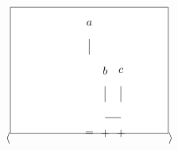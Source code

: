 \documentclass{article}
\begin{document}
\[
\langle
\begin{tikzpicture}[scale=0.5]
  \draw[fill=white] (0,0) rectangle (10,8);
  \node at (5,7) {$a$};
  \draw (5,6) -- (5,5); %
  \node at (6,4) {$b$};
  \node at (7,4) {$c$};
  \draw (6,3) -- (6,2); %
  \draw (7,3) -- (7,2); %
  \draw (6,1) -- (7,1); %
  \draw (5,0) node {$=$}; %
  \draw (6,0) node {$+$};
  \draw (7,0) node {$+$};
\end{tikzpicture}
\rangle
\]
\end{document}
